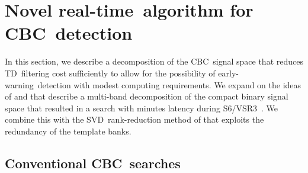\documentclass[preprint2]{aastex}
\newcommand{\earlywarning}{early-warning}
\newcommand{\CBC}{CBC}%
\newcommand{\realtime}{real-time}
\newcommand{\SVD}{SVD}%
\newcommand{\TD}{TD}%
\begin{document}
\section{Novel \realtime\ algorithm for \CBC\ detection}
\label{sec:method}

In this section, we describe a decomposition of the \CBC\ signal space that
reduces \TD\ filtering cost sufficiently to allow for the
possibility of \earlywarning\ detection with modest computing requirements.  We
expand on the ideas of \citet{Marion2004} and \citet{Buskulic2010} that describe a
multi-band decomposition of the compact binary signal space that resulted in
a search with minutes latency during S6/VSR3~\citep{HugheyGWPAW2011}.  We combine this
with the \SVD\ rank-reduction method of \citet{Cannon:2010p10398} that exploits
the redundancy of the template banks.

\subsection{Conventional \CBC\ searches}
\end{document}
